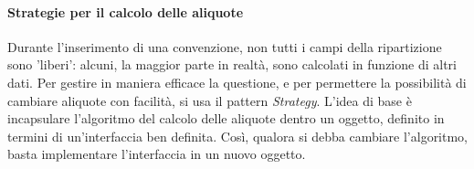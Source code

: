 \paragraph{Strategie per il calcolo delle aliquote}
Durante l'inserimento di una convenzione, non tutti i campi della ripartizione sono 'liberi': alcuni, la maggior parte in realtà, sono calcolati in funzione di altri dati. Per gestire in maniera efficace la questione, e per permettere la possibilità di cambiare aliquote con facilità, si usa il pattern \textsl{Strategy}. L'idea di base è incapsulare l'algoritmo del calcolo delle aliquote dentro un oggetto, definito in termini di un'interfaccia ben definita. Così, qualora si debba cambiare l'algoritmo, basta implementare l'interfaccia in un nuovo oggetto. 

